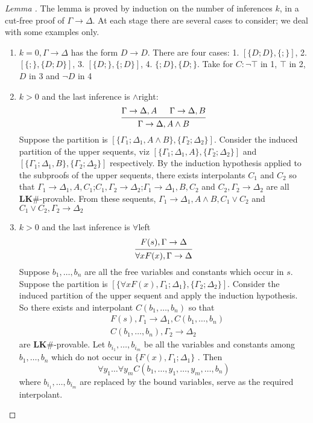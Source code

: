 \documentclass[11pt]{article}
\def \LKsh {\textbf{LK\#}}
\begin{document}
\begin{proof}[Lemma \cite{lemma6.5}]
The lemma is proved by induction on the number of inferences \(k\), in a cut-free proof
of \(\Gamma\to\Delta\). At each stage there are several cases to consider; we deal with some
examples only.
\begin{enumerate}
\item \(k=0,\Gamma\to\Delta\)  has the form \(D\to D\). There are four
cases: 1.
\([\{D;D\},\{;\}]\), 2. \([\{;\},\{D;D\}]\), 3. \([\{D;\},\{;D\}]\), 4. \(\{;D\},\{D;\}\).
Take for \(C:\neg\top\) in 1, \(\top\) in 2, \(D\) in 3 and \(\neg D\) in 4
\item \(k>0\) and the last inference is \(\wedge\)right:
\begin{equation*}
\begin{prooftree}%
\hypo{\Gamma\to\Delta,A}
\hypo{\Gamma\to\Delta,B}
\infer2{\Gamma\to\Delta,A\wedge B}
\end{prooftree}
\end{equation*}
Suppose the partition is \([\{\Gamma_1;\Delta_1,A\wedge B\},\{\Gamma_2;\Delta_2\}]\). Consider
the induced partition of the upper sequents,
viz \([\{\Gamma_1;\Delta_1,A\},\{\Gamma_2;\Delta_2\}]\)
and \([\{\Gamma_1;\Delta_1,B\},\{\Gamma_2;\Delta_2\}]\) respectively. By the induction
hypothesis applied to the subproofs of the upper sequents, there exists interpolants \(C_1\)
and \(C_2\) so that
\(\Gamma_1\to\Delta_1,A,C_1\);\(C_1,\Gamma_2\to\Delta_2\);\(\Gamma_1\to\Delta_1,B,C_2\)
and \(C_2,\Gamma_2\to\Delta_2\) are all \(\LKsh\)-provable. From these
sequents, \(\Gamma_1\to\Delta_1,A\wedge B,C_1\vee C_2\) and \(C_1\vee C_2,\Gamma_2\to\Delta_2\)
\item \(k>0\) and the last inference is \(\forall\)left
\begin{equation*}
\begin{prooftree}%
\hypo{F(s),\Gamma\to\Delta}
\infer1{\forall xF(x),\Gamma\to\Delta}
\end{prooftree}
\end{equation*}
Suppose \(b_1,\dots,b_n\) are all the free variables and constants which occur in \(s\).
Suppose the partition is \([\{\forall xF(x),\Gamma_1;\Delta_1\},\{\Gamma_2;\Delta_2\}]\). Consider
the induced partition of the upper sequent and apply the induction hypothesis. So there exists
and interpolant \(C(b_1,\dots,b_n)\) so that 
\begin{align*}
&F(s),\Gamma_1\to\Delta_1,C(b_1,\dots,b_n)\\
&C(b_1,\dots,b_n),\Gamma_2\to\Delta_2
\end{align*}
are \(\LKsh\)-provable. Let \(b_{i_1},\dots,b_{i_m}\) be all the variables and constants
among \(b_1,\dots,b_n\) which do not occur in \(\{F(x),\Gamma_1;\Delta_1\}\) . Then
\begin{equation*}
\forall y_1\dots\forall y_mC(b_1,\dots,y_1,\dots,y_m,\dots,b_n)
\end{equation*}
where \(b_{i_1},\dots,b_{i_m}\) are replaced by the bound variables, serve as the required
interpolant.


\end{enumerate}
\end{proof}
\end{document}
